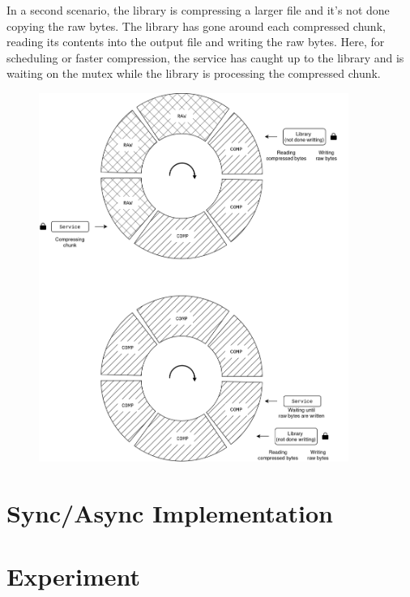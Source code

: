 \documentclass[12pt]{article}
\begin{document}
\newpage
\par In a second scenario, the library is compressing a larger file and it's not done copying the raw bytes.
The library has gone around each compressed chunk, reading its contents into the output file and writing the raw bytes.
Here, for scheduling or faster compression, the service has caught up to the library and is waiting on the mutex while the library is processing the compressed chunk.
\begin{figure}[h]
\centering
\includegraphics[width=0.9\textwidth]{AOS-not-done.png}
\end{figure}
\FloatBarrier


\section*{Sync/Async Implementation}



\section*{Experiment}
\end{document}
